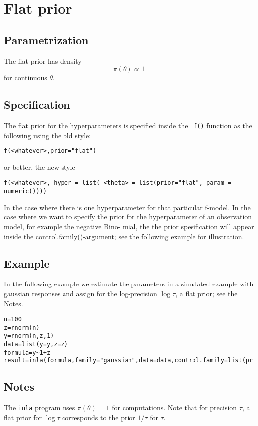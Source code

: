\documentclass[a4paper,11pt]{article}
\begin{document}
\section*{ Flat prior}

\subsection*{Parametrization}
The flat prior has density
\begin{equation}
\pi(\theta)\propto 1
\end{equation}
for continuous $\theta$.
 
\subsection*{Specification}
The flat prior for the hyperparameters is specified inside the {\tt
    f()} function as the following using the old style:
\begin{center}
    {\tt f(<whatever>,prior="flat")}
\end{center}
or better, the new style
\begin{center}
    {\tt f(<whatever>, hyper = list( <theta> = list(prior="flat",
        param = numeric())))}
\end{center}
In the case where there is one hyperparameter for that particular
f-model. In the case where we want to specify the prior for the
hyperparameter of an observation model, for example the negative Bino-
mial, the the prior spesification will appear inside the
control.family()-argument; see the following example for illustration.

\subsection*{Example}

In the following example we estimate the parameters in a simulated
example with gaussian responses and assign for the log-precision
$\log\tau$, a flat prior; see the Notes.
\begin{verbatim}
n=100
z=rnorm(n)
y=rnorm(n,z,1)
data=list(y=y,z=z)
formula=y~1+z
result=inla(formula,family="gaussian",data=data,control.family=list(prior="flat"))
\end{verbatim}

\subsection*{Notes}

The {\tt inla} program uses $\pi(\theta)=1$ for computations.  Note
that for precision $\tau$, a flat prior for $\log\tau$ corresponds to
the prior $1/\tau$ for $\tau$.
\end{document}
